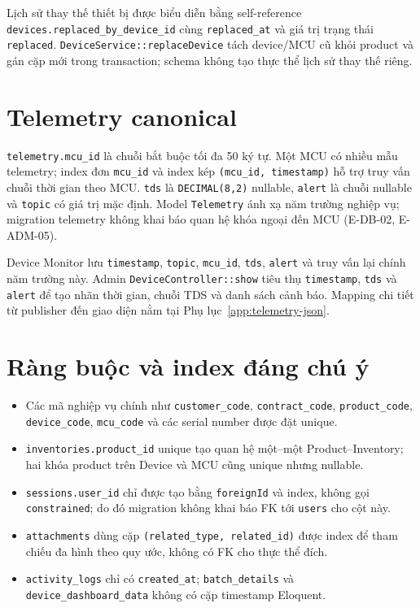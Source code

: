 Lịch sử thay thế thiết bị được biểu diễn bằng self-reference
\texttt{devices.replaced\_by\_device\_id} cùng \texttt{replaced\_at} và giá trị
trạng thái \texttt{replaced}. \texttt{DeviceService::replaceDevice} tách device/MCU cũ
khỏi product và gán cặp mới trong transaction; schema không tạo thực thể
lịch sử thay thế riêng.

\section{Telemetry canonical}

\texttt{telemetry.mcu\_id} là chuỗi bắt buộc tối đa 50 ký tự. Một MCU có
nhiều mẫu telemetry; index đơn \texttt{mcu\_id} và index kép
\texttt{(mcu\_id, timestamp)} hỗ trợ truy vấn chuỗi thời gian theo MCU.
\texttt{tds} là \texttt{DECIMAL(8,2)} nullable, \texttt{alert} là chuỗi
nullable và \texttt{topic} có giá trị mặc định. Model \texttt{Telemetry}
ánh xạ năm trường nghiệp vụ; migration telemetry không khai báo quan hệ khóa
ngoại đến MCU (E-DB-02, E-ADM-05).

Device Monitor lưu \texttt{timestamp}, \texttt{topic}, \texttt{mcu\_id},
\texttt{tds}, \texttt{alert} và truy vấn lại chính năm trường này.
Admin \texttt{DeviceController::show} tiêu thụ \texttt{timestamp}, \texttt{tds}
và \texttt{alert} để tạo nhãn thời gian, chuỗi TDS và danh sách cảnh báo.
Mapping chi tiết từ publisher đến giao diện nằm tại
Phụ lục~\ref{app:telemetry-json}.

\section{Ràng buộc và index đáng chú ý}

\begin{itemize}
  \item Các mã nghiệp vụ chính như \texttt{customer\_code},
  \texttt{contract\_code}, \texttt{product\_code}, \texttt{device\_code},
  \texttt{mcu\_code} và các serial number được đặt unique.
  \item \texttt{inventories.product\_id} unique tạo quan hệ một--một
  Product--Inventory; hai khóa product trên Device và MCU cũng unique nhưng nullable.
  \item \texttt{sessions.user\_id} chỉ được tạo bằng \texttt{foreignId}
  và index, không gọi \texttt{constrained}; do đó migration không khai báo FK
  tới \texttt{users} cho cột này.
  \item \texttt{attachments} dùng cặp
  \texttt{(related\_type, related\_id)} được index để tham chiếu đa hình
  theo quy ước, không có FK cho thực thể đích.
  \item \texttt{activity\_logs} chỉ có \texttt{created\_at};
  \texttt{batch\_details} và \texttt{device\_dashboard\_data} không có
  cặp timestamp Eloquent.
\end{itemize}


